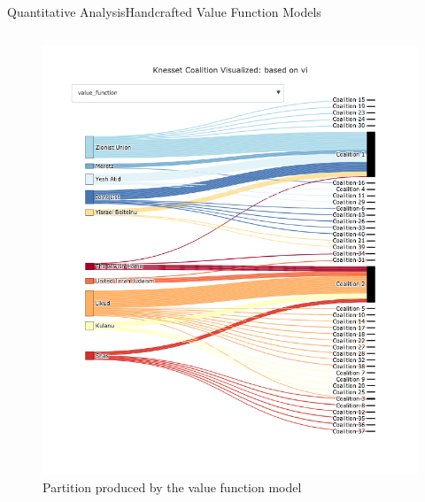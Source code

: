 \documentclass[xcolor=dvipsnames]{beamer}
\begin{document}
\begin{frame}{Quantitative Analysis}{Handcrafted Value Function Models}
\begin{columns}
\begin{figure}
    \includegraphics[width=\linewidth]{value_function}
    \caption[Partition visualization: value function model]{Partition produced by the value function model}
  \end{figure}
  \end{columns}
\end{frame}
\end{document}
